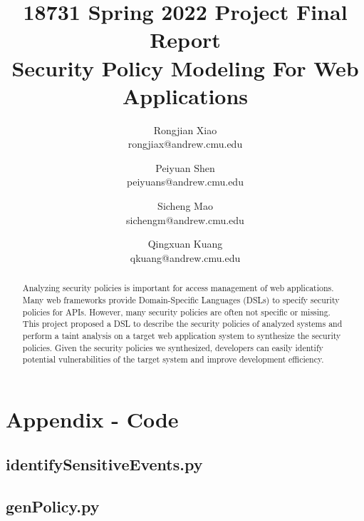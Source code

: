 \documentclass[twocolumn,10pt]{article}
\begin{document}
\title{18731 Spring 2022 Project Final Report\\
  Security Policy Modeling For Web Applications}

\author{
  Rongjian Xiao \\ rongjiax@andrew.cmu.edu \and
  Peiyuan Shen \\ peiyuans@andrew.cmu.edu \and
  Sicheng Mao \\ sichengm@andrew.cmu.edu \and
  Qingxuan Kuang \\ qkuang@andrew.cmu.edu
}

\maketitle

\begin{abstract}

  Analyzing security policies is important for access management of web
  applications.
  Many web frameworks provide Domain-Specific Languages (DSLs) to specify
  security policies for APIs.
  However, many security policies are often not specific or missing.
  This project proposed a DSL to describe the security policies of analyzed
  systems and perform a taint analysis on a target web application system to
  synthesize the security policies.
  Given the security policies we synthesized, developers can easily identify
  potential vulnerabilities of the target system and improve development
  efficiency.

\end{abstract}







{
  \footnotesize
  \raggedright
  
  
}

\newpage
\onecolumn
\section{Appendix - Code}

\lstset{style=mystyle}

\subsection*{\centering \large identifySensitiveEvents.py}


\subsection*{\centering \large genPolicy.py}

\end{document}
